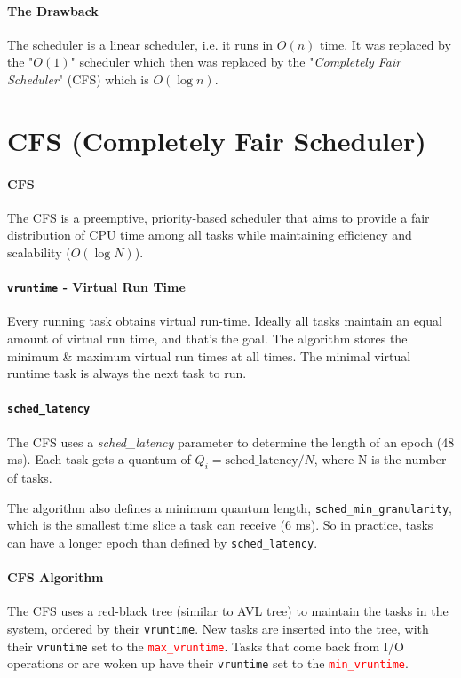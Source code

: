 \documentclass[openany,12pt]{book}
\newcommand{\code}[1]{\texttt{#1}}
\newcommand{\red}[1]{\textcolor{Red}{#1}}
\begin{document}
\paragraph{The Drawback} The scheduler is a linear scheduler, i.e. it runs in \(O(n)\) time. It was replaced by the "\(O(1)\)" scheduler which then was replaced by the "\textit{Completely Fair Scheduler}" (CFS) which is \(O(\log n)\).







\section*{CFS (Completely Fair Scheduler)}

\paragraph{CFS} The CFS is a preemptive, priority-based scheduler that aims to provide a fair distribution of CPU time among all tasks while maintaining efficiency and scalability (\(O(\log N)\)).


\paragraph{\code{vruntime} - Virtual Run Time} Every running task obtains virtual run-time. Ideally all tasks maintain an equal amount of virtual run time, and that's the goal. The algorithm stores the minimum \& maximum virtual run times at all times. The minimal virtual runtime task is always the next task to run.


\paragraph{\code{sched\_latency}} The CFS uses a \textit{sched\_latency} parameter to determine the length of an epoch (48 ms). Each task gets a quantum of \(Q_i=\text{sched\_latency}/N\), where N is the number of tasks.


The algorithm also defines a minimum quantum length, \code{sched\_min\_granularity}, which is the smallest time slice a task can receive (6 ms). So in practice, tasks can have a longer epoch than defined by \code{sched\_latency}.


\paragraph{CFS Algorithm} The CFS uses a red-black tree (similar to AVL tree) to maintain the tasks in the system, ordered by their \code{vruntime}. New tasks are inserted into the tree, with their \code{vruntime} set to the \red{\code{max\_vruntime}}. Tasks that come back from I/O operations or are woken up have their \code{vruntime} set to the \red{\code{min\_vruntime}}. 
\end{document}
